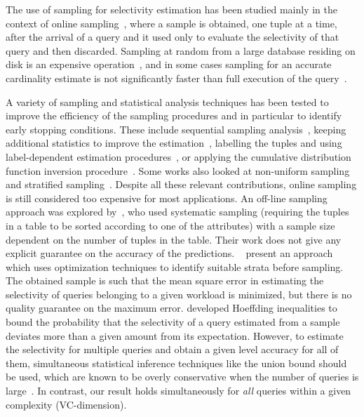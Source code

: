 The use of sampling for selectivity estimation has been studied mainly in the
context of online sampling~\citep{LiptonNS90,LiptonN95}, where a sample is
obtained, one tuple at a time, after the arrival of a query and it used only
to evaluate the selectivity of that query and then discarded. Sampling at random
from a large database residing
on disk is an expensive operation~\citep{Olken93,BrownH06,GemullaLH06}, and in
some cases sampling for an accurate cardinality estimate is not significantly
faster than full execution of the query~\citep{HaasNSS93,HaasNS94}.

A variety of sampling and statistical analysis techniques has been tested to 
improve the efficiency of the sampling procedures and in particular
to identify early stopping conditions. These include sequential sampling
analysis~\citep{HouOD91,HaasS92}, keeping additional statistics to improve the
estimation~\citep{HaasS95}, labelling the tuples and using label-dependent
estimation procedures~\citep{GangulyGMS96}, or applying the cumulative distribution
function inversion procedure~\citep{WuAE01}. Some works also looked at non-uniform
sampling~\citep{BabcockCD03,EstanN06} and stratified
sampling~\citep{ChaudhuriDN07,JoshiJ08}. Despite all these relevant
contributions, online sampling is still considered too expensive for most
applications. An off-line sampling approach was explored by~\citet{NguHS04}, who
used systematic sampling (requiring the
tuples in a
table to be sorted according to one of the attributes) with a
sample size dependent on the number of tuples in the table. Their work does
not give any explicit guarantee on the accuracy of the predictions.
~\citet{ChaudhuriDN07} present an approach which uses
optimization techniques to identify suitable strata before sampling. The
obtained sample is such that the mean square error in estimating the selectivity
of queries belonging to a given workload is minimized, but there is no quality
guarantee on the maximum error. \citet{Haas96} developed Hoeffding
inequalities to bound the probability that the selectivity of a query estimated
from a sample deviates more than a given amount from its expectation.
However, to estimate the selectivity for multiple queries and obtain a given
level accuracy for all of them, simultaneous statistical inference techniques
like the union bound should be used, which are known to be overly conservative
when the number of queries is large~\citep{Miller81}. In contrast, our result
holds simultaneously for \emph{all} queries within a given complexity (VC-dimension). 

